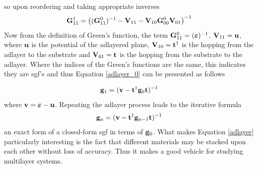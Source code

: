 \documentclass[a4paper, 12pt]{article}
\begin{document}
so upon reordering and taking appropriate inverses	
	\begin{equation}\label{adlayer_0}
		{\bf G}_{11}^1=\left(({\bf G}_{11}^0)^{-1}-{\bf V}_{11} -{\bf V}_{10}{\bf G}_{00}^0{\bf V}_{01}\right)^{-1}
	\end{equation}
	Now from the definition of Green's function, the term ${\bf G}_{11}^0 = (\bm\varepsilon)^{-1}$. ${\bf V}_{11} = \bf u$, where $\bf u$ is the potential of the adlayered plane, ${\bf V}_{10}=\bf t^\dagger$ is the hopping from the adlayer to the substrate and ${\bf V}_{01} = \bf t$ is the hopping from the substrate to the adlayer. Where the indices of the Green's functions are the same, this indicates they are \gls{sgf}'s and thus Equation \eqref{adlayer_0} can be presented as follows

\begin{equation}
	{\bf g}_1 = ({\bf v-t}^{\dag}{\bf g}_0{\bf t})^{-1}
\end{equation}
where $\bf v = \bm\varepsilon-u$. Repeating the adlayer process leads to the iterative formula
\begin{equation}\label{adlayer}
	\bf{g_{\rm n}} = (\bf{v}-\bf{t}^{\dag}\bf{g_{\rm n-1}t})^{\rm -1}
\end{equation}
an exact form of a closed-form \gls{sgf} in terms of ${\bf g}_0$. What makes Equation \eqref{adlayer} particularly interesting is the fact that different materials may be stacked upon each other without loss of accuracy. Thus it makes a good vehicle for studying multilayer systems.
\end{document}
